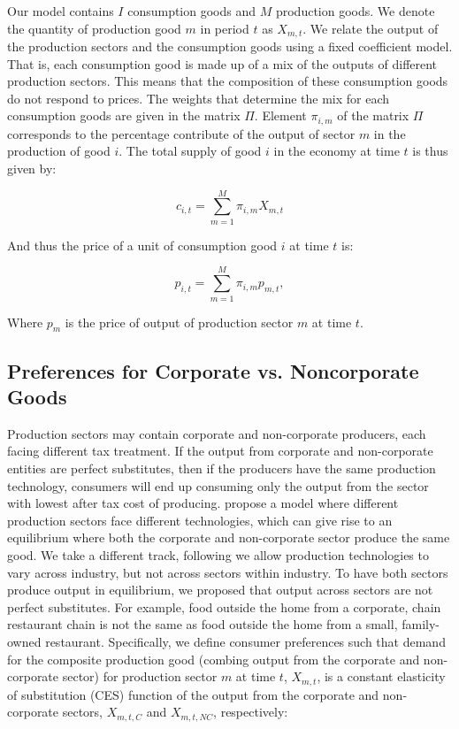     Our model contains $I$ consumption goods and $M$ production goods.  We denote the quantity of production good $m$ in period $t$ as $X_{m,t}$.  We relate the output of the production sectors and the consumption goods using a fixed coefficient model. That is, each consumption good is made up of a mix of the outputs of different production sectors.  This means that the composition of these consumption goods do not respond to prices. The weights that determine the mix for each consumption goods are given in the matrix $\Pi$.  Element $\pi_{i,m}$ of the matrix $\Pi$ corresponds to the percentage contribute of the output of sector $m$ in the production of good $i$.  The total supply of good $i$ in the economy at time $t$ is thus given by: 
    
             \begin{equation} \label{eqn:mix_cons}
             c_{i,t} = \sum_{m=1}^{M}\pi_{i,m}X_{m,t} 
    	\end{equation}
	
	And thus the price of a unit of consumption good $i$ at time $t$ is:
	
             \begin{equation} \label{eqn:mix_cons_price}
             p_{i,t} = \sum_{m=1}^{M}\pi_{i,m}p_{m,t}, 
    	\end{equation}
    
    Where $p_{m}$ is the price of output of production sector $m$ at time $t$.
    
    \subsection{Preferences for Corporate vs. Noncorporate Goods}\label{sec:pref_corp_noncorp}
    
    Production sectors may contain corporate and non-corporate producers, each facing different tax treatment.  If the output from corporate and non-corporate entities are perfect substitutes, then if the producers have the same production technology, consumers will end up consuming only the output from the sector with lowest after tax cost of producing.  \citet{GK1989} propose a model where different production sectors face different technologies, which can give rise to an equilibrium where both the corporate and non-corporate sector produce the same good.  We take a different track, following \citet{FR1993} we allow production technologies to vary across industry, but not across sectors within industry.  To have both sectors produce output in equilibrium, we proposed that output across sectors are not perfect substitutes.  For example, food outside the home from a corporate, chain restaurant chain is not the same as food outside the home from a small, family-owned restaurant.  Specifically, we define consumer preferences such that demand for the composite production good (combing output from the corporate and non-corporate sector) for production sector $m$ at time $t$, $X_{m,t}$, is a constant elasticity of substitution (CES) function of the output from the corporate and non-corporate sectors, $X_{m,t,C}$ and $X_{m,t,NC}$, respectively:
    
